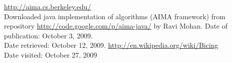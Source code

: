 \documentclass[11pt,twoside,a4paper]{mr}%
\begin{document}
 





\clearpage
\begin{thebibliography}{9}
		\url{http://aima.cs.berkeley.edu/} \\
		{Downloaded java implementation of algorithms (AIMA framework) from repository \url{http://code.google.com/p/aima-java/} by Ravi Mohan. Date of publication: October 3, 2009. \\
		Date retrieved: October 12, 2009. }
\url{http://en.wikipedia.org/wiki/Bicing}\\
{Date visited: October 27, 2009}


\end{thebibliography}
\end{document}
